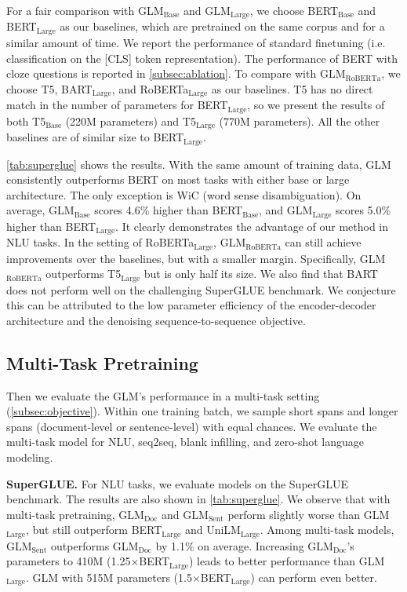 For a fair comparison with GLM$_\text{Base}$ and GLM$_\text{Large}$, we choose BERT$_\text{Base}$ and BERT$_\text{Large}$ as our baselines, which are pretrained on the same corpus and for a similar amount of time. We report the performance of standard finetuning (i.e. classification on the [CLS] token representation). The performance of BERT with cloze questions is reported in \ref{subsec:ablation}. To compare with GLM$_{\text{RoBERTa}}$, we choose T5, BART$_\text{Large}$, and RoBERTa$_\text{Large}$ as our baselines. T5 has no direct match in the number of parameters for BERT$_\text{Large}$, so we present the results of both T5$_\text{Base}$ (220M parameters) and T5$_\text{Large}$ (770M parameters). All the other baselines are of similar size to BERT$_\text{Large}$.

\ref{tab:superglue} shows the results. With the same amount of training data, GLM consistently outperforms BERT on most tasks with either base or large architecture. The only exception is WiC (word sense disambiguation). On average, GLM$_\text{Base}$ scores 4.6\% higher than BERT$_\text{Base}$, and GLM$_\text{Large}$ scores 5.0\% higher than BERT$_\text{Large}$. It clearly demonstrates the advantage of our method in NLU tasks. In the setting of RoBERTa$_\text{Large}$, GLM$_{\text{RoBERTa}}$ can still achieve improvements over the baselines, but with a smaller margin. Specifically, GLM$_{\text{RoBERTa}}$ outperforms T5$_\text{Large}$ but is only half its size. We also find that BART does not perform well on the challenging SuperGLUE benchmark. We conjecture this can be attributed to the low parameter efficiency of the encoder-decoder architecture and the denoising sequence-to-sequence objective. 

\subsection{Multi-Task Pretraining}
\label{subsec:multi_obj}
Then we evaluate the GLM's performance in a multi-task setting (\ref{subsec:objective}). Within one training batch, we sample short spans and longer spans (document-level or sentence-level) with equal chances. We evaluate the multi-task model for NLU, seq2seq, blank infilling, and zero-shot language modeling.

\textbf{SuperGLUE.}
For NLU tasks, we evaluate models on the SuperGLUE benchmark. The results are also shown in \ref{tab:superglue}. We observe that with multi-task pretraining, GLM$_\text{Doc}$ and GLM$_\text{Sent}$ perform slightly worse than GLM$_\text{Large}$, but still outperform BERT$_\text{Large}$ and UniLM$_\text{Large}$. Among multi-task models, GLM$_\text{Sent}$ outperforms GLM$_\text{Doc}$ by 1.1\% on average. Increasing GLM$_\text{Doc}$'s parameters to 410M (1.25$\times$BERT$_\text{Large}$) leads to better performance than GLM$_\text{Large}$. GLM with 515M parameters (1.5$\times$BERT$_\text{Large}$) can perform even better.

